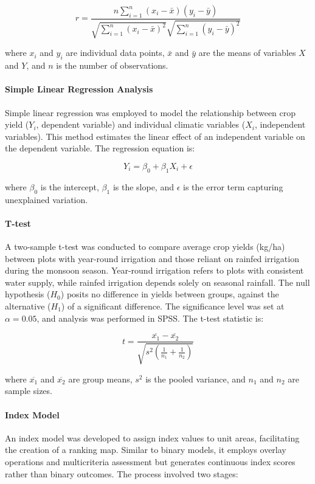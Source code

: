 \[
r = \frac{n \sum_{i=1}^{n} (x_i - \bar{x})(y_i - \bar{y})}{\sqrt{\sum_{i=1}^{n} (x_i - \bar{x})^2} \sqrt{\sum_{i=1}^{n} (y_i - \bar{y})^2}}
\]

where $x_i$ and $y_i$ are individual data points, $\bar{x}$ and $\bar{y}$ are the means of variables $X$ and $Y$, and $n$ is the number of observations.

\paragraph{Simple Linear Regression Analysis}  
Simple linear regression was employed to model the relationship between crop yield ($Y_i$, dependent variable) and individual climatic variables ($X_i$, independent variables). This method estimates the linear effect of an independent variable on the dependent variable. The regression equation is:

\[
Y_i = \beta_0 + \beta_1 X_i + \epsilon
\]

where $\beta_0$ is the intercept, $\beta_1$ is the slope, and $\epsilon$ is the error term capturing unexplained variation.

\paragraph{T-test}  
A two-sample t-test was conducted to compare average crop yields (kg/ha) between plots with year-round irrigation and those reliant on rainfed irrigation during the monsoon season. Year-round irrigation refers to plots with consistent water supply, while rainfed irrigation depends solely on seasonal rainfall. The null hypothesis ($H_0$) posits no difference in yields between groups, against the alternative ($H_1$) of a significant difference. The significance level was set at $\alpha = 0.05$, and analysis was performed in SPSS. The t-test statistic is:

\[
t = \frac{\overline{x_1} - \overline{x_2}}{\sqrt{s^2 \left( \frac{1}{n_1} + \frac{1}{n_2} \right)}}
\]

where $\overline{x_1}$ and $\overline{x_2}$ are group means, $s^2$ is the pooled variance, and $n_1$ and $n_2$ are sample sizes.

\paragraph{Index Model}  
An index model was developed to assign index values to unit areas, facilitating the creation of a ranking map. Similar to binary models, it employs overlay operations and multicriteria assessment but generates continuous index scores rather than binary outcomes.
The process involved two stages:

